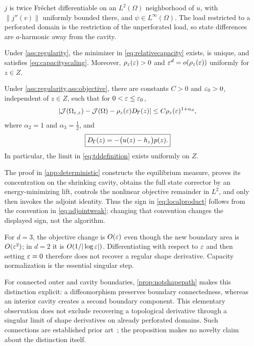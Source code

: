 \begin{assumption}
\label{ass:objective}
$j$ is twice Fr\'echet differentiable on an $L^2(\Omega)$ neighborhood of
$u$, with $\|j''(v)\|$ uniformly bounded there, and
$\psi\in L^\infty(\Omega)$.  The load restricted to a perforated domain is
the restriction of the unperforated load, so state differences are
$a$-harmonic away from the cavity.
\end{assumption}

\begin{theorem}
\label{thm:capacityscale}
Under \cref{ass:regularity}, the minimizer in
\cref{eq:relativecapacity} exists, is unique, and satisfies
\cref{eq:capacityscaling}.  Moreover, $\rho_z(\varepsilon)>0$ and
$\varepsilon^d=o(\rho_z(\varepsilon))$ uniformly for $z\in Z$.
\end{theorem}

\begin{theorem}
\label{thm:localtd}
Under \cref{ass:regularity,ass:objective}, there are constants
$C>0$ and $\varepsilon_0>0$, independent of $z\in Z$, such that for
$0<\varepsilon\le\varepsilon_0$,
\begin{equation}
 \left|\mathcal{J}(\Omega_{\varepsilon,z})-\mathcal{J}(\Omega)
 -\rho_z(\varepsilon)D_{\!T}(z)\right|
 \le C\rho_z(\varepsilon)^{1+\alpha_d},
 \label{eq:quantitativesmallhole}
\end{equation}
where $\alpha_2=1$ and $\alpha_3=\tfrac12$, and
\begin{equation}
 \boxed{D_{\!T}(z)=-\bigl(u(z)-h_z\bigr)p(z).}
 \label{eq:localproduct}
\end{equation}
In particular, the limit in \cref{eq:tddefinition} exists uniformly on $Z$.
\end{theorem}

The proof in \cref{app:deterministic} constructs the equilibrium measure,
proves its concentration on the shrinking cavity, obtains the full state
corrector by an energy-minimizing lift, controls the nonlinear objective
remainder in $L^2$, and only then invokes the adjoint identity.  Thus the sign
in \cref{eq:localproduct} follows from the convention in
\cref{eq:adjointweak}; changing that convention changes the displayed sign,
not the algorithm.

\begin{remark}
For $d=3$, the objective change is $O(\varepsilon)$ even though the new boundary area
is $O(\varepsilon^2)$; in $d=2$ it is $O(1/|\log\varepsilon|)$.  Differentiating with
respect to $\varepsilon$ and then setting $\varepsilon=0$ therefore does not recover a
regular shape derivative.  Capacity normalization is the essential singular
step.
\end{remark}



For connected outer and cavity boundaries, \cref{prop:notshapepath} makes
this distinction explicit: a diffeomorphism preserves boundary connectedness,
whereas an interior cavity creates a second boundary component.
This elementary observation does not exclude recovering a topological
derivative through a singular limit of shape derivatives on already
perforated domains.  Such connections are established prior
art~\cite{cea2000topological}; the proposition makes no novelty claim about
the distinction itself.
